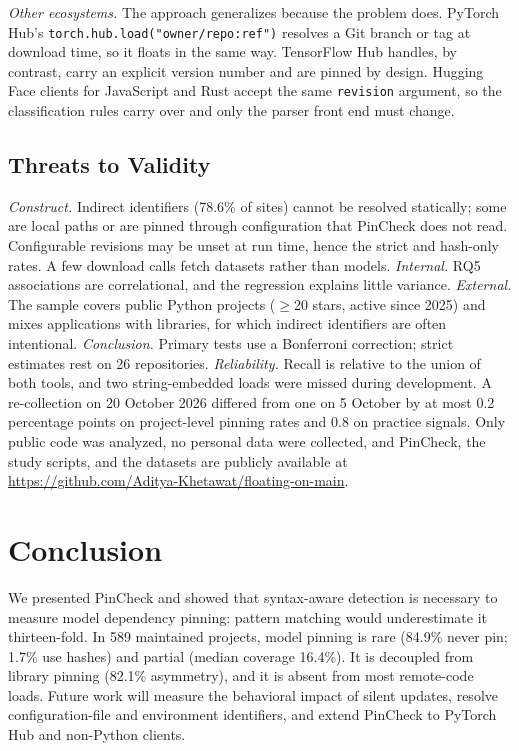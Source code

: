 \documentclass[conference]{IEEEtran}
\begin{document}
\textit{Other ecosystems.} The approach generalizes because the problem does. PyTorch Hub's \texttt{torch.hub.load("owner/repo:ref")} resolves a Git branch or tag at download time, so it floats in the same way. TensorFlow Hub handles, by contrast, carry an explicit version number and are pinned by design. Hugging Face clients for JavaScript and Rust accept the same \texttt{revision} argument, so the classification rules carry over and only the parser front end must change.

\subsection{Threats to Validity}
\textit{Construct.} Indirect identifiers (78.6\% of sites) cannot be resolved statically; some are local paths or are pinned through configuration that PinCheck does not read. Configurable revisions may be unset at run time, hence the strict and hash-only rates. A few download calls fetch datasets rather than models.
\textit{Internal.} RQ5 associations are correlational, and the regression explains little variance.
\textit{External.} The sample covers public Python projects ($\geq$20 stars, active since 2025) and mixes applications with libraries, for which indirect identifiers are often intentional.
\textit{Conclusion.} Primary tests use a Bonferroni correction; strict estimates rest on 26 repositories.
\textit{Reliability.} Recall is relative to the union of both tools, and two string-embedded loads were missed during development. A re-collection on 20 October 2026 differed from one on 5 October by at most 0.2 percentage points on project-level pinning rates and 0.8 on practice signals. Only public code was analyzed, no personal data were collected, and PinCheck, the study scripts, and the datasets are publicly available at \url{https://github.com/Aditya-Khetawat/floating-on-main}.

\section{Conclusion}
We presented PinCheck and showed that syntax-aware detection is necessary to measure model dependency pinning: pattern matching would underestimate it thirteen-fold. In 589 maintained projects, model pinning is rare (84.9\% never pin; 1.7\% use hashes) and partial (median coverage 16.4\%). It is decoupled from library pinning (82.1\% asymmetry), and it is absent from most remote-code loads. Future work will measure the behavioral impact of silent updates, resolve configuration-file and environment identifiers, and extend PinCheck to PyTorch Hub and non-Python clients.
\end{document}
